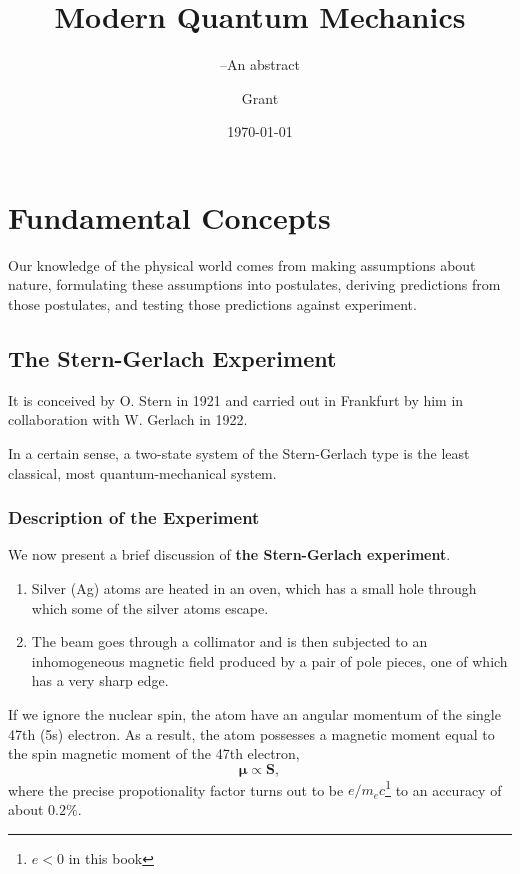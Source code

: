 \documentclass[11pt]{elegantbook}
\title{Modern Quantum Mechanics}
\subtitle{--An abstract}
\author{Grant}
\institute{DEP, THU}
\date{\today}
\begin{document}
\maketitle

\frontmatter
\tableofcontents

\mainmatter

\chapter{Fundamental Concepts}

Our knowledge of the physical world comes from making assumptions about nature, 
formulating these assumptions into postulates, deriving predictions from those 
postulates, and testing those predictions against experiment.

\section{The Stern-Gerlach Experiment}

It is conceived by O. Stern in 1921 and carried out in Frankfurt by him in collaboration 
with W. Gerlach in 1922.

In a certain sense, a two-state system of the Stern-Gerlach type is the least classical, 
most quantum-mechanical system.

\subsection{Description of the Experiment}

We now present a brief discussion of \textbf{the Stern-Gerlach experiment}.

\begin{enumerate}
  \item Silver (Ag) atoms are heated in an oven, which has a small hole through which 
  some of the silver atoms escape.
  \item The beam goes through a collimator and is then subjected to an inhomogeneous 
  magnetic field produced by a pair of pole pieces, one of which has a very sharp edge.
\end{enumerate}

If we ignore the nuclear spin, the atom have an angular momentum of the single 47th (5s) 
electron. As a result, the atom possesses a magnetic moment equal to the spin magnetic moment of the 
47th electron, 
\begin{equation}
  \bm{\mu}\propto \bm{S},
\end{equation}
where the precise propotionality factor turns out to be $e/m_ec$\footnote{$e<0$ in this book} 
to an accuracy of about $0.2\%$.
\end{document}
